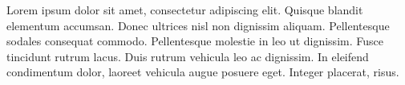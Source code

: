 Lorem ipsum dolor sit amet, consectetur adipiscing elit. Quisque
blandit elementum accumsan. Donec ultrices nisl non dignissim
aliquam. Pellentesque sodales consequat commodo. Pellentesque
molestie in leo ut dignissim. Fusce tincidunt rutrum lacus. Duis
rutrum vehicula leo ac dignissim. In eleifend condimentum dolor,
laoreet vehicula augue posuere eget. Integer placerat, risus. 

